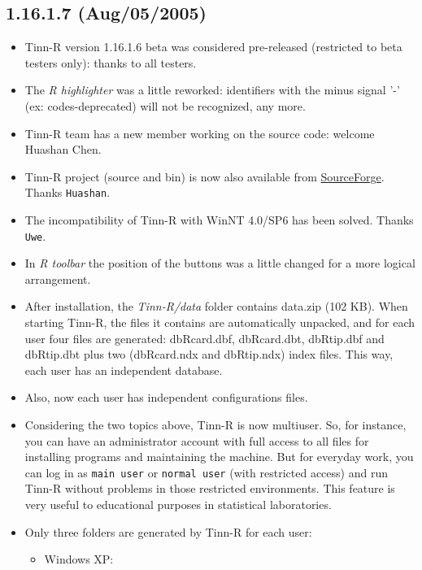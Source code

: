 \subsection*{1.16.1.7 (Aug/05/2005)}
\begin{itemize}
  \item Tinn-R version 1.16.1.6 beta was considered pre-released
    (restricted to beta testers only): thanks to all testers.
  \item The \textit{R highlighter} was a little reworked: identifiers
    with the minus signal '-' (ex: codes-deprecated) will not be
    recognized, any more.
  \item Tinn-R team has a new member working on the source code:
    welcome Huashan Chen.
  \item Tinn-R project (source and bin) is now also available from
    \href{https://sourceforge.net/projects/tinn-r}{SourceForge}.
    Thanks \texttt{Huashan}.
  \item The incompatibility of Tinn-R with WinNT 4.0/SP6 has been solved.
    Thanks \texttt{Uwe}.
  \item In \textit{R toolbar} the position of the buttons was a little changed
    for a more logical arrangement.
  \item After installation, the \textit{Tinn-R/data} folder contains
    data.zip (102 KB). When starting Tinn-R, the files it contains
    are automatically unpacked, and for each user four files
    are generated: dbRcard.dbf, dbRcard.dbt, dbRtip.dbf and dbRtip.dbt
    plus two (dbRcard.ndx and dbRtip.ndx) index files. This way, each
    user has an independent database.
  \item Also, now each user has independent configurations files.
  \item Considering the two topics above, Tinn-R is now multiuser. So,
    for instance, you can have an administrator account with full access
    to all files for installing programs and maintaining the machine.
    But for everyday work, you can log in as \texttt{main user} or
    \texttt{normal user} (with restricted access) and run Tinn-R
    without problems in those restricted environments. This feature
    is very useful to educational purposes in statistical laboratories.
  \item Only three folders are generated by Tinn-R for each user:
    \begin{itemize}
      \item Windows XP:
        \begin{footnotesize}
          \begin{itemize}

\end{itemize}
\end{footnotesize}
\end{itemize}
\end{itemize}
